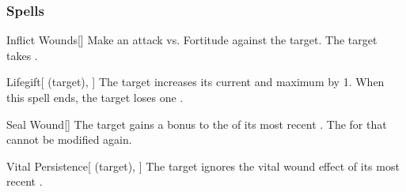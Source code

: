 \subsubsection{Spells}


\lowercase{\hypertarget{spell:Inflict Wounds}{}}\label{spell:Inflict Wounds}
\begin{freeability}[\nth{1}]{\hypertarget{spell:Inflict Wounds}{Inflict Wounds}}[]
Make an attack vs. Fortitude against the target.
\hit The target takes .
\end{freeability}
\vspace{0.25em}



\lowercase{\hypertarget{spell:Lifegift}{}}\label{spell:Lifegift}
\begin{attuneability}[\nth{1}]{\hypertarget{spell:Lifegift}{Lifegift}}[ (target), ]
The target increases its current and maximum  by 1.
When this spell ends, the target loses one .
\end{attuneability}
\vspace{0.25em}



\lowercase{\hypertarget{spell:Seal Wound}{}}\label{spell:Seal Wound}
\begin{freeability}[\nth{1}]{\hypertarget{spell:Seal Wound}{Seal Wound}}[]
The target gains a  bonus to the  of its most recent .
The  for that  cannot be modified again.
\end{freeability}
\vspace{0.25em}



\lowercase{\hypertarget{spell:Vital Persistence}{}}\label{spell:Vital Persistence}
\begin{attuneability}[\nth{2}]{\hypertarget{spell:Vital Persistence}{Vital Persistence}}[ (target), ]
The target ignores the vital wound effect of its most recent .
\end{attuneability}
\vspace{0.25em}



